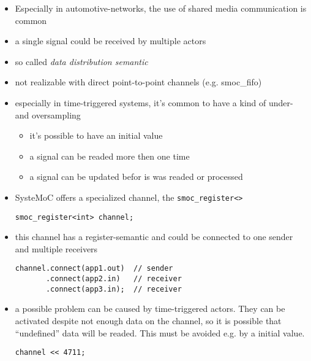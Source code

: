 \begin{frame}[fragile=singleslide]
\begin{itemize}
\item Especially in automotive-networks, the use of shared media communication is common
\item a single signal could be received by multiple actors
\item so called \textit{data distribution semantic}
\item not realizable with direct point-to-point channels (e.g. smoc\_fifo)
\item especially in time-triggered systems, it's common to have a kind of under- and oversampling
\begin{itemize}
\item it's possible to have an initial value
\item a signal can be readed more then one time
\item a signal can be updated befor is was readed or processed
\end{itemize}
\end{itemize}
\end{frame}




\begin{frame}[fragile=singleslide]
\begin{itemize}
\item SysteMoC offers a specialized channel, the \lstinline{smoc_register<>}
\begin{lstlisting}
smoc_register<int> channel;
\end{lstlisting}
\item this channel has a register-semantic and could be connected to one sender and multiple receivers
\begin{lstlisting}
channel.connect(app1.out)  // sender
       .connect(app2.in)   // receiver
       .connect(app3.in);  // receiver
\end{lstlisting}
\item a possible problem can be caused by time-triggered actors. They can be activated despite not enough data on the channel,
 so it is possible that ``undefined'' data will be readed. This must be avoided e.g. by a initial value.
\begin{lstlisting}
channel << 4711;
\end{lstlisting}
\end{itemize}
\end{frame}




